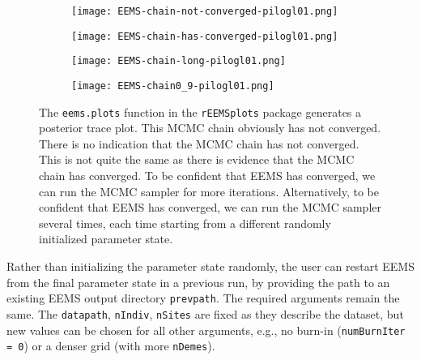 \documentclass[a4paper,10pt,DIV=15,titlepage,mpinclude=true]{scrartcl}
\newcommand{\keystring}[1]{{\tt #1}}
\begin{document}
\begin{figure}[htb]

\begin{subfigure}[t]{0.47\textwidth}
\centering
\texttt{[image: EEMS-chain-not-converged-pilogl01.png]}
\caption{}
\label{fig:EEMS-convergence:not-converged}
\end{subfigure}
\begin{subfigure}[t]{0.47\textwidth}
\centering
\texttt{[image: EEMS-chain-has-converged-pilogl01.png]}
\caption{}
\label{fig:EEMS-convergence:has-converged}
\end{subfigure}

\vspace{20pt}

\begin{subfigure}[t]{0.47\textwidth}
\centering
\texttt{[image: EEMS-chain-long-pilogl01.png]}
\caption{}
\label{fig:EEMS-convergence:long-chain}
\end{subfigure}
\begin{subfigure}[t]{0.47\textwidth}
\centering
\texttt{[image: EEMS-chain0\_9-pilogl01.png]}
\caption{}
\label{fig:EEMS-convergence:multiple-chains}
\end{subfigure}


\caption[EEMS graphics with default options]{The \keystring{eems.plots} function in the \keystring{rEEMSplots} package generates a posterior trace plot. 
 This MCMC chain obviously has not converged. 
 There is no indication that the MCMC chain has not converged. This is not quite the same as there is evidence that the MCMC chain has converged. 
 To be confident that EEMS has converged, we can run the MCMC sampler for more iterations.
 Alternatively, to be confident that EEMS has converged, we can run the MCMC sampler several times, each time starting from a different randomly initialized parameter state.}
\label{fig:EEMS-convergence}
\end{figure}

Rather than initializing the parameter state randomly, the user can restart EEMS from the final parameter state in a previous run, by providing the path to an existing EEMS output directory \keystring{prevpath}. The required arguments remain the same. The \keystring{datapath}, \keystring{nIndiv}, \keystring{nSites} are fixed as they describe the dataset, but new values can be chosen for all other arguments, e.g., no burn-in (\keystring{numBurnIter = 0}) or a denser grid (with more \keystring{nDemes}).
\end{document}
